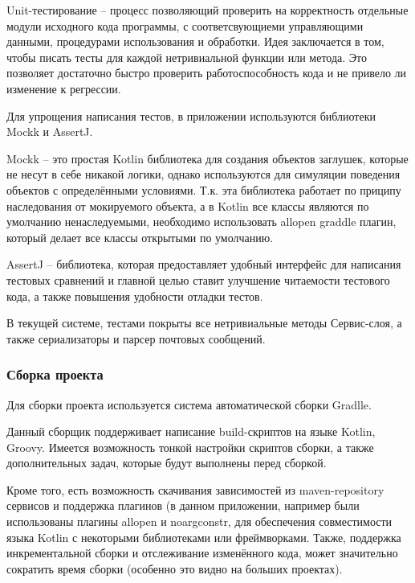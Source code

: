Unit-тестирование – процесс позволяющий проверить на корректность отдельные модули исходного кода программы, с соответсвующиеми управляющими данными, процедурами использования и обработки. Идея заключается в том, чтобы писать тесты для каждой нетривиальной функции или метода. Это позволяет достаточно быстро проверить работоспособность кода и не привело ли изменение к регрессии.

Для упрощения написания тестов, в приложении используются библиотеки Mockk и AssertJ.

Mockk – это простая Kotlin библиотека для создания объектов заглушек, которые не несут в себе никакой логики, однако используются для симуляции поведения объектов с определёнными условиями. Т.к. эта библиотека работает по приципу наследования от мокируемого объекта, а в Kotlin все классы являются по умолчанию ненаследуемыми, необходимо использовать allopen graddle плагин, который делает все классы открытыми по умолчанию.

AssertJ – библиотека, которая предоставляет удобный интерфейс для написания тестовых сравнений и главной целью ставит улучшение читаемости тестового кода, а также повышения удобности отладки тестов.

В текущей системе, тестами покрыты все нетривиальные методы Сервис-слоя, а также сериализаторы и парсер почтовых сообщений.


\subsubsection{Сборка проекта}\indent

Для сборки проекта используется система автоматической сборки Gradlle.

Данный сборщик поддерживает написание build-скриптов на языке Kotlin, Groovy. Имеется возможность тонкой настройки скриптов сборки, а также дополнительных задач, которые будут выполнены перед сборкой.

Кроме того, есть возможность скачивания зависимостей из maven-repository сервисов и поддержка плагинов (в данном приложении, например были использованы плагины allopen и noargconstr, для обеспечения совместимости языка Kotlin с некоторыми библиотеками или фреймворками. Также, поддержка инкрементальной сборки и отслеживание изменённого кода, может значительно сократить время сборки (особенно это видно на больших проектах).
